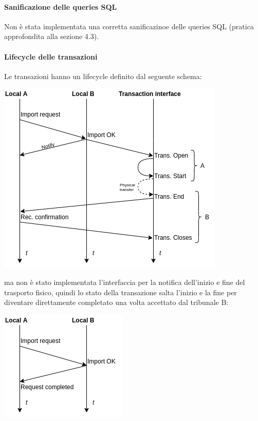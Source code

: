 {\paragraph{Sanificazione delle queries SQL}
Non è stata implementata una corretta sanificazinoe delle queries SQL (pratica approfondita alla sezione 4.3).

\paragraph{Lifecycle delle transazioni}
Le transazioni hanno un lifecycle definito dal seguente schema:
\begin{center}
    \includegraphics[scale=0.8]{images/tl.png}
\end{center}
ma non è stato implementata l'interfaccia per la notifica dell'inizio e fine del trasporto fisico, quindi lo stato della transazione salta l'inizio e la fine per diventare direttamente completato una volta accettato dal tribunale B:
\begin{center}
    \includegraphics[scale=0.8]{images/tl1.png}
\end{center}

}
